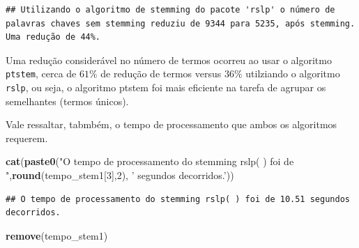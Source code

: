 \documentclass[]{article}
\newenvironment{Shaded}{\begin{snugshade}}{\end{snugshade}}
\newcommand{\DecValTok}[1]{\textcolor[rgb]{0.00,0.00,0.81}{#1}}
\newcommand{\KeywordTok}[1]{\textcolor[rgb]{0.13,0.29,0.53}{\textbf{#1}}}
\newcommand{\NormalTok}[1]{#1}
\newcommand{\OperatorTok}[1]{\textcolor[rgb]{0.81,0.36,0.00}{\textbf{#1}}}
\newcommand{\StringTok}[1]{\textcolor[rgb]{0.31,0.60,0.02}{#1}}
\begin{document}
\begin{Shaded}
\end{Shaded}

\begin{verbatim}
## Utilizando o algoritmo de stemming do pacote 'rslp' o número de palavras chaves sem stemming reduziu de 9344 para 5235, após stemming. Uma redução de 44%.
\end{verbatim}

Uma redução considerável no número de termos ocorreu ao usar o algoritmo
\texttt{ptstem}, cerca de \(61\%\) de redução de termos versus \(36\%\)
utilziando o algoritmo \texttt{rslp}, ou seja, o algoritmo ptstem foi
mais eficiente na tarefa de agrupar os semelhantes (termos únicos).

Vale ressaltar, tabmbém, o tempo de processamento que ambos os
algoritmos requerem.

\begin{Shaded}
\begin{Highlighting}[]
\KeywordTok{cat}\NormalTok{(}\KeywordTok{paste0}\NormalTok{(}\StringTok{"O tempo de processamento do stemming rslp( ) foi de "}\NormalTok{,}\KeywordTok{round}\NormalTok{(tempo_stem1[}\DecValTok{3}\NormalTok{],}\DecValTok{2}\NormalTok{), }\StringTok{' segundos decorridos.'}\NormalTok{))}
\end{Highlighting}
\end{Shaded}

\begin{verbatim}
## O tempo de processamento do stemming rslp( ) foi de 10.51 segundos decorridos.
\end{verbatim}

\begin{Shaded}
\begin{Highlighting}[]
\KeywordTok{remove}\NormalTok{(tempo_stem1)}
\end{Highlighting}
\end{Shaded}
\end{document}

